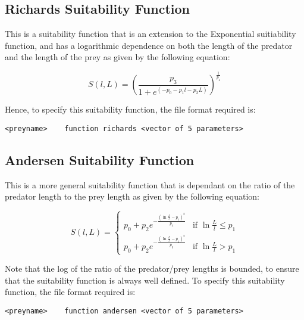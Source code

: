 \documentclass[]{book}
\begin{document}
\hypertarget{richards-suitability-function}{%
\subsection{Richards Suitability Function}\label{richards-suitability-function}}

This is a suitability function that is an extension to the Exponential
suitiability function, and has a logarithmic dependence on both the
length of the predator and the length of the prey as given by the
following equation:

\begin{equation}
\label{eq:richsuit}
S(l, L) = \left({\frac{p_3}{1 + e^{(- p_0 - p_1 l - p_2  L)}}}\right) ^ {\frac{1}{p_4}}\end{equation}

Hence, to specify this suitability function, the file format required
is:

\begin{verbatim}
<preyname>    function richards <vector of 5 parameters>
\end{verbatim}

\hypertarget{andersen-suitability-function}{%
\subsection{Andersen Suitability Function}\label{andersen-suitability-function}}

This is a more general suitability function that is dependant on the
ratio of the predator length to the prey length as given by the
following equation:

\begin{equation}
\label{eq:andersensuit}
S(l, L) =
\begin{cases}
p_0 + p_2e^{-\frac{(\ln\frac{L}{l} - p_1)^2}{p_4}} & \textrm{if $\ln\frac{L}{l} \leq p_1$} \\
p_0 + p_2e^{-\frac{(\ln\frac{L}{l} - p_1)^2}{p_3}} & \textrm{if $\ln\frac{L}{l} > p_1$}
\end{cases}\end{equation}

Note that the log of the ratio of the predator/prey lengths is bounded,
to ensure that the suitability function is always well defined. To
specify this suitability function, the file format required is:

\begin{verbatim}
<preyname>    function andersen <vector of 5 parameters>
\end{verbatim}
\end{document}

